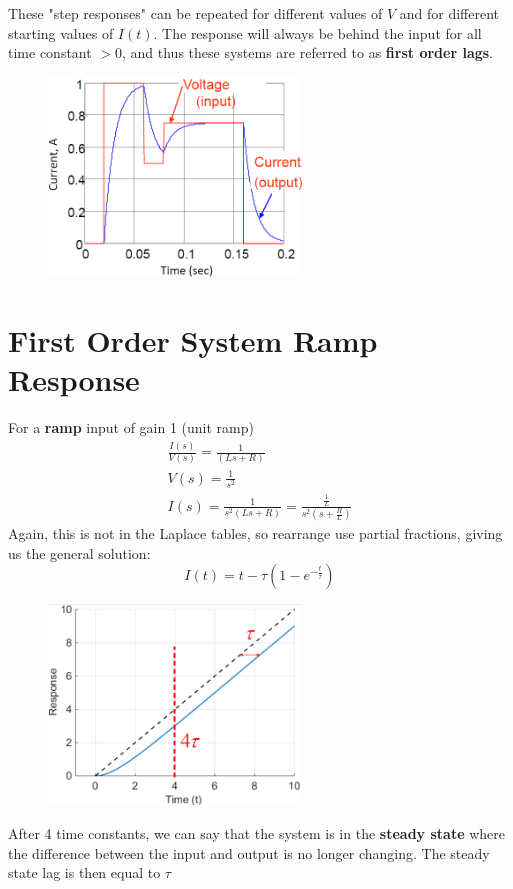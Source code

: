 \documentclass[class=report, crop=false, 12pt,a4paper, tikz, border=4mm]{standalone}
\begin{document}
These "step responses" can be repeated for different values of $V$ and for different starting values of $I(t)$. The response will always be behind the input for all time constant $>0$, and thus these systems are referred to as \textbf{first order lags}.
\begin{figure}[H]
  \centering
  \includegraphics[width = 0.6\textwidth]{../img/diagram33.png}
\end{figure}
\section{First Order System Ramp Response}
For a \textbf{ramp} input of gain 1 (unit ramp)
\begin{gather}
  \frac{I(s)}{V(s)} = \frac{1}{(Ls+R)}\\
  V(s) = \frac{1}{s^2}\\
  I(s) = \frac{1}{s^2(Ls+R)} = \frac{\frac{1}{L}}{s^2(s+\frac{R}{L})}
\end{gather}
Again, this is not in the Laplace tables, so rearrange use partial fractions, giving us the general solution:
\begin{equation}
  I(t) = t - \tau \left(1 - e^{-\frac{t}{\tau}}\right)
\end{equation}
\begin{figure}[H]
  \centering
  \includegraphics[width = 0.6\textwidth]{../img/diagram34.png}
\end{figure}
After 4 time constants, we can say that the system is in the \textbf{steady state} where the difference between the input and output is no longer changing. The steady state lag is then equal to $\tau$
\end{document}
